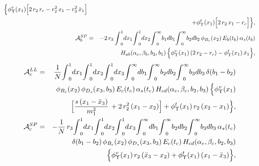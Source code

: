 \documentclass[preprint,superscriptaddress,nofootinbib]{revtex4}
\begin{document}
\begin{appendix}
\begin{eqnarray}
   \Big\{ {\phi}_{\Upsilon}^{v}(x_{1}) \Big[
   2\,r_{2}\,r_{c}-r_{2}^{2}\,x_{1}-r_{3}^{2}\,\bar{x}_{1} \Big]
   \nonumber \\ & &
   + {\phi}_{\Upsilon}^{t}(x_{1}) \Big[ 2\,r_{2}\,x_{1}-r_{c} \Big] \Big\}
   \label{amp-figb-01}, \\
  {\cal A}_{b}^{SP} &=& -2\,r_{3}\,
  {\int}_{0}^{1}dx_{1} {\int}_{0}^{1}dx_{2}
  {\int}_{0}^{\infty}b_{1} db_{1}
  {\int}_{0}^{\infty}b_{2} db_{2}\,
  {\phi}_{B_{c}}(x_{2})\, E_{b}(t_{b})\,
  {\alpha}_{s}(t_{b})
   \nonumber \\ & &
  H_{ab}({\alpha}_{e},{\beta}_{b},b_{2},b_{1})\,
   \Big\{ {\phi}_{\Upsilon}^{v}(x_{1})\,( 2\,r_{2}-r_{c})
 -{\phi}_{\Upsilon}^{t}(x_{1})\,\bar{x}_{1}\Big\}
   \label{amp-figb-03},
   \end{eqnarray}
   \begin{eqnarray}
  {\cal A}_{c}^{LL} &=& \frac{1}{N}
  {\int}_{0}^{1}dx_{1} {\int}_{0}^{1}dx_{2} {\int}_{0}^{1}dx_{3}
  {\int}_{0}^{\infty} db_{1}
  {\int}_{0}^{\infty}b_{2} db_{2}
  {\int}_{0}^{\infty}b_{3} db_{3}\,
  {\delta}(b_{1}-b_{2})
   \nonumber \\ & &
  {\phi}_{B_{c}}(x_{2})\, {\phi}_{D_{s}}(x_{3},b_{3})\,
  E_{c}(t_{c})\,{\alpha}_{s}(t_{c})\,
  H_{cd}({\alpha}_{e},{\beta}_{c},b_{2},b_{3})\,
   \Big\{ {\phi}_{\Upsilon}^{v}(x_{1})
   \nonumber \\ & &
   \Big[ \frac{s\,(x_{1}-\bar{x}_{3}) }{m_{1}^{2}}\,
   +2\,r_{2}^{2}\,(x_{1}-x_{2}) \Big]
   +{\phi}_{\Upsilon}^{t}(x_{1})\, r_{2}\,(x_{2}-x_{1}) \Big\}
   \label{amp-figc-01}, \\
  {\cal A}_{c}^{SP} &=& -\frac{1}{N}\,r_{3}
  {\int}_{0}^{1}dx_{1} {\int}_{0}^{1}dx_{2} {\int}_{0}^{1}dx_{3}
  {\int}_{0}^{\infty} db_{1}
  {\int}_{0}^{\infty}b_{2} db_{2}
  {\int}_{0}^{\infty}b_{3} db_{3}\,{\alpha}_{s}(t_{c})
   \nonumber \\ & &
  {\delta}(b_{1}-b_{2})\,
  {\phi}_{B_{c}}(x_{2})\, {\phi}_{D_{s}}(x_{3},b_{3})\,
  E_{c}(t_{c})\,
  H_{cd}({\alpha}_{e},{\beta}_{c},b_{2},b_{3})
   \nonumber \\ & &
   \Big\{ {\phi}_{\Upsilon}^{v}(x_{1})\,r_{2}\,
   (\bar{x}_{3}-x_{2})
   +{\phi}_{\Upsilon}^{t}(x_{1})\, (x_{1}-\bar{x}_{3}) \Big\}
   \label{amp-figc-03},
   \end{eqnarray}

\end{appendix}
\end{document}
